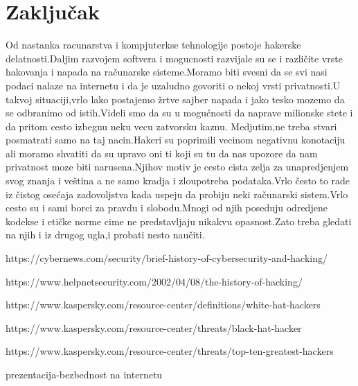 \documentclass[a4paper]{article}
\begin{document}
\section{Zaključak}
\label{sec:zakljucak}
Od nastanka racunarstva i kompjuterkse tehnologije postoje hakerske delatnosti.Daljim razvojem softvera i mogucnosti razvijale su se i različite vrste hakovanja i napada na računarske sisteme.Moramo biti svesni da se svi nasi podaci nalaze na internetu i da je uzaludno govoriti o nekoj vrsti privatnosti.U takvoj situaciji,vrlo lako postajemo žrtve sajber napada i jako tesko mozemo da se odbranimo od istih.Videli smo da su u mogućnosti da naprave milionske stete i da pritom cesto izbegnu neku vecu zatvorsku kaznu.
\newline
Medjutim,ne treba stvari posmatrati samo na taj nacin.Hakeri su poprimili vecinom negativnu konotaciju ali moramo shvatiti da su upravo oni ti koji su tu da nas upozore da nam privatnost moze biti narusena.Njihov motiv je cesto cista zelja za unapredjenjem svog znanja i veština a ne samo kradja i zloupotreba podataka.Vrlo često to rade iz čistog osećaja zadovoljstva kada uspeju da probiju neki računarski sistem.Vrlo cesto su i sami borci za pravdu i slobodu.Mnogi od njih poseduju odredjene kodekse i etičke norme cime ne predstavljaju nikakvu opasnost.Zato treba gledati na njih i iz drugog ugla,i probati nesto naučiti.
 

\newpage


\appendix

\begin{thebibliography}{9}

 https://cybernews.com/security/brief-history-of-cybersecurity-and-hacking/

 https://www.helpnetsecurity.com/2002/04/08/the-history-of-hacking/

 https://www.kaspersky.com/resource-center/definitions/white-hat-hackers

 https://www.kaspersky.com/resource-center/threats/black-hat-hacker

  https://www.kaspersky.com/resource-center/threats/top-ten-greatest-hackers

 prezentacija-bezbednost na internetu


\end{thebibliography}




\appendix
\end{document}
